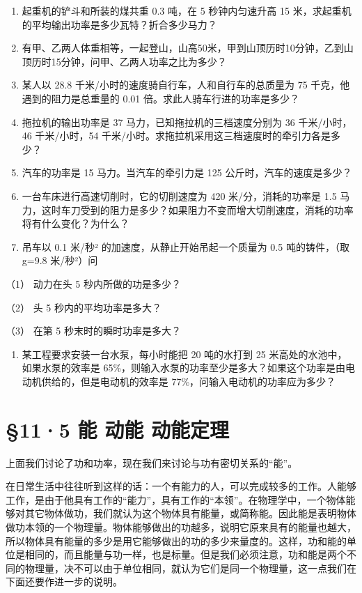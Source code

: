 \begin{enumerate}
\def\labelenumi{\arabic{enumi}.}
\item
  起重机的铲斗和所装的煤共重 0.3 吨，在 5 秒钟内匀速升高 15
  米，求起重机的平均输出功率是多少瓦特？折合多少马力？
\item
  有甲、乙两人体重相等，一起登山，山高50米，甲到山顶历时10分钟，乙到山顶历时15分钟，问甲、乙两人功率之比为多少？
\item
  某人以 28.8 千米/小时的速度骑自行车，人和自行车的总质量为 75
  千克，他遇到的阻力是总重量的 0.01 倍。求此人骑车行进的功率是多少？
\item
  拖拉机的输出功率是 37 马力，已知拖拉机的三档速度分别为 36
  千米/小时，46 千米/小时，54
  千米/小时。求拖拉机采用这三档速度时的牵引力各是多少？
\item
  汽车的功率是 15 马力。当汽车的牵引力是 125 公斤时，汽车的速度是多少？
\item
  一台车床进行高速切削时，它的切削速度为 420 米/分，消耗的功率是 1.5
  马力，这时车刀受到的阻力是多少？如果阻力不变而增大切削速度，消耗的功率将有什么变化？为什么？
\item
  吊车以 0.1 米/秒² 的加速度，从静止开始吊起一个质量为 0.5
  吨的铸件，（取 g=9.8 米/秒²）问
\end{enumerate}

（1） 动力在头 5 秒内所做的功是多少？

（2） 头 5 秒内的平均功率是多大？

（3） 在第 5 秒末时的瞬时功率是多大？

\begin{enumerate}
\def\labelenumi{\arabic{enumi}.}
\setcounter{enumi}{7}
\tightlist
\item
  某工程要求安装一台水泵，每小时能把 20 吨的水打到 25
  米高处的水池中，如果水泵的效率是
  65\%，则输入水泵的功率至少是多大？如果这个功率是由电动机供给的，但是电动机的效率是
  77\%，问输入电动机的功率应为多少？
\end{enumerate}

\section{§11·5 能 动能
动能定理}\label{ux80fd-ux52a8ux80fd-ux52a8ux80fdux5b9aux7406}

上面我们讨论了功和功率，现在我们来讨论与功有密切关系的``能''。

在日常生活中往往听到这样的话：一个有能力的人，可以完成较多的工作。人能够工作，是由于他具有工作的``能力''，具有工作的``本领''。在物理学中，一个物体能够对其它物体做功，我们就认为这个物体具有能量，或简称能。因此能是表明物体做功本领的一个物理量。物体能够做出的功越多，说明它原来具有的能量也越大，所以物体具有能量的多少是用它能够做出的功的多少来量度的。这样，功和能的单位是相同的，而且能量与功一样，也是标量。但是我们必须注意，功和能是两个不同的物理量，决不可以由于单位相同，就认为它们是同一个物理量，这一点我们在下面还要作进一步的说明。

